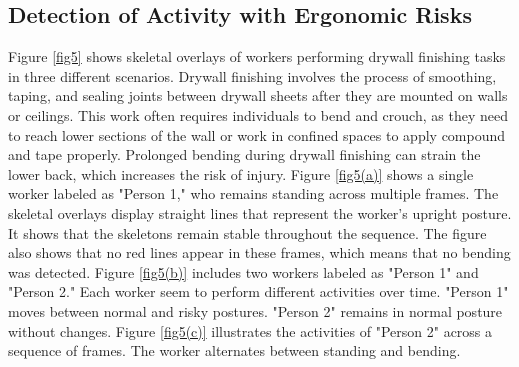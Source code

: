 \documentclass[11pt]{article}
\begin{document}
\subsection{Detection of Activity with Ergonomic Risks}


Figure \ref{fig5} shows skeletal overlays of workers performing drywall finishing tasks in three different scenarios. Drywall finishing involves the process of smoothing, taping, and sealing joints between drywall sheets after they are mounted on walls or ceilings. This work often requires individuals to bend and crouch, as they need to reach lower sections of the wall or work in confined spaces to apply compound and tape properly. Prolonged bending during drywall finishing can strain the lower back, which increases the risk of injury. Figure \ref{fig5(a)} shows a single worker labeled as "Person 1," who remains standing across multiple frames. The skeletal overlays display straight lines that represent the worker’s upright posture. It shows that the skeletons remain stable throughout the sequence. The figure also shows that no red lines appear in these frames, which means that no bending was detected. Figure \ref{fig5(b)} includes two workers labeled as "Person 1" and "Person 2." Each worker seem to perform different activities over time. "Person 1" moves between normal and risky postures. "Person 2" remains in normal posture without changes. Figure \ref{fig5(c)} illustrates the activities of "Person 2" across a sequence of frames. The worker alternates between standing and bending. 
\end{document}
